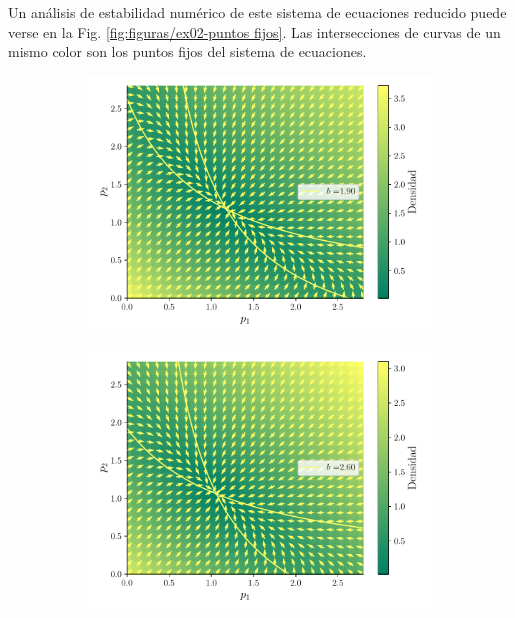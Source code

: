 \documentclass[twocolumn,aps,prl]{revtex4-1}
\begin{document}
Un análisis de estabilidad numérico de este sistema de ecuaciones reducido puede verse en la Fig. \ref{fig:figuras/ex02-puntos fijos}. Las intersecciones de curvas de un mismo color son los puntos fijos del sistema de ecuaciones.

\begin{figure}[ht!]
  \centering
  \begin{subfigure}[b]{0.49\linewidth}
      \centering
      \includegraphics[width = 0.999\textwidth]{figuras/ex02-cosa3-0.pdf}
  \end{subfigure}\quad
  \begin{subfigure}[b]{0.49\linewidth}
      \centering
      \includegraphics[width = 0.999\textwidth]{figuras/ex02-cosa3-1.pdf}

\end{subfigure}
\end{figure}
\end{document}
